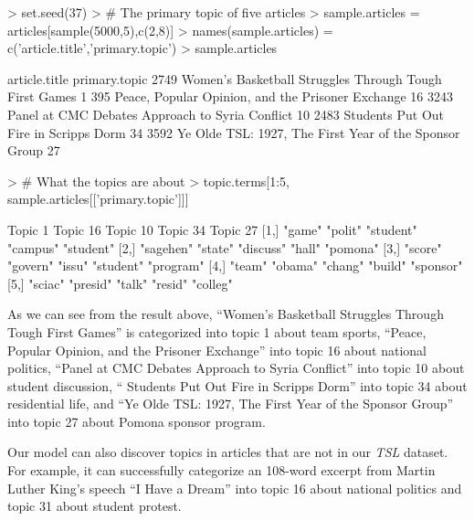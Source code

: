 \documentclass[a4paper]{article}
\begin{document}
\begin{Schunk}
\begin{Sinput}
> set.seed(37)
> # The primary topic of five articles
> sample.articles = articles[sample(5000,5),c(2,8)]
> names(sample.articles) = c('article.title','primary.topic')
> sample.articles
\end{Sinput}
\begin{Soutput}
                                              article.title primary.topic
2749 Women's Basketball Struggles Through Tough First Games             1
395       Peace, Popular Opinion, and the Prisoner Exchange            16
3243        Panel at CMC Debates Approach to Syria Conflict            10
2483                  Students Put Out Fire in Scripps Dorm            34
3592 Ye Olde TSL: 1927, The First Year of the Sponsor Group            27
\end{Soutput}
\begin{Sinput}
> # What the topics are about
> topic.terms[1:5, sample.articles[['primary.topic']]]
\end{Sinput}
\begin{Soutput}
     Topic 1   Topic 16 Topic 10  Topic 34  Topic 27 
[1,] "game"    "polit"  "student" "campus"  "student"
[2,] "sagehen" "state"  "discuss" "hall"    "pomona" 
[3,] "score"   "govern" "issu"    "student" "program"
[4,] "team"    "obama"  "chang"   "build"   "sponsor"
[5,] "sciac"   "presid" "talk"    "resid"   "colleg" 
\end{Soutput}
\end{Schunk}

As we can see from the result above, ``Women's Basketball Struggles Through Tough First Games'' is categorized into topic 1 about team sports, ``Peace, Popular Opinion, and the Prisoner Exchange'' into topic 16 about national politics, ``Panel at CMC Debates Approach to Syria Conflict'' into topic 10 about student discussion, `` Students Put Out Fire in Scripps Dorm'' into topic 34 about residential life, and ``Ye Olde TSL: 1927, The First Year of the Sponsor Group'' into topic 27 about Pomona sponsor program. 

Our model can also discover topics in articles that are not in our \textit{TSL} dataset. For example, it can successfully categorize an 108-word excerpt from Martin Luther King's speech ``I Have a Dream'' into topic 16 about national politics and topic 31 about student protest.
\end{document}
